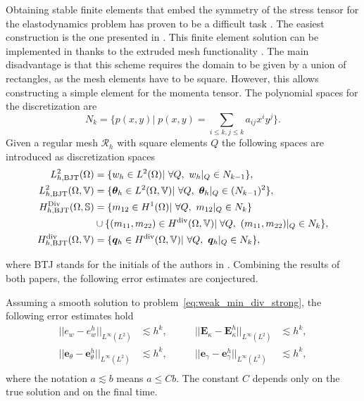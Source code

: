Obtaining stable finite elements that embed the symmetry of the stress tensor for the elastodynamics problem has proven to be a difficult task \cite{arnold2002mixed}. The easiest construction is the one presented in \cite{becache2001elas}. This finite element solution can be implemented in {} \cite{rathgeber2017firedrake} thanks to the extruded mesh functionality \cite{mcrae2016}.  The main disadvantage is that this scheme requires the domain to be given by a union of rectangles, as the mesh elements have to be square. However, this allows constructing a simple element for the momenta tensor. The polynomial spaces for the discretization are
\[
N_{k} = \{p(x, y)| \; p(x, y) = \sum_{i\le k, j\le k} a_{ij} x^i y^j  \}.
\]
Given a regular mesh $\mathcal{R}_h$ with square elements $Q$ the following spaces are introduced as discretization spaces
\begin{equation}
\label{eq:BTJ}
\begin{aligned}
L_{h, \text{BJT}}^2(\Omega) &= \{w_h \in L^2(\Omega) | \ \forall Q, \ w_h|_{Q} \in N_{k-1} \}, \\
L_{h, \text{BJT}}^2(\Omega, \mathbb{V}) &= \{\bm{\theta}_h \in L^2(\Omega, \mathbb{V}) | \ \forall Q,\ \bm{\theta}_h|_{Q} \in (N_{k-1})^2 \}, \\
H_{h, \text{BJT}}^{\operatorname*{Div}}(\Omega, \mathbb{S}) &= \{m_{12} \in H^1(\Omega)| \ \forall Q,\ m_{12}|_{Q} \in N_{k} \}  \\
&\cup \{(m_{11}, m_{22}) \in H^{\operatorname{div}}(\Omega, \mathbb{V})| \; \forall Q,\ (m_{11}, m_{22})|_{Q} \in N_{k} \}, \\
H_{h, \text{BJT}}^{\operatorname{div}}(\Omega, \mathbb{V}) &= \{\bm{q}_h \in H^{\operatorname{div}}(\Omega, \mathbb{V}) | \ \forall Q,\ \bm{q}_h|_{Q} \in N_{k} \}, \\ 
\end{aligned}
\end{equation}

where BTJ stands for the initials of the authors in \cite{becache2000wave,becache2001elas}. Combining the results of both papers, the following error estimates are conjectured.
\begin{conjecture}\label{conj:BJTestimates}
	Assuming a smooth solution to problem~\eqref{eq:weak_min_div_strong}, the following error estimates hold 
	\begin{equation}
	\label{eq:errBEC}
	\begin{aligned}
	||e_w - e_w^h||_{L^{\infty}(L^2)} &\lesssim h^{k}, \\
	||\bm{e}_\theta - \bm{e}_\theta^h||_{L^{\infty}(L^2)} &\lesssim h^{k}, \\
	\end{aligned} \qquad
	\begin{aligned}
	||\bm{E}_\kappa - \bm{E}_\kappa^h||_{L^{\infty}(L^2)} &\lesssim  h^{k}, \\
	||\bm{e}_\gamma - \bm{e}_\gamma^ h||_{L^{\infty}(L^2)} &\lesssim  h^{k}, \\
	\end{aligned} 
	\end{equation}
	where the notation $a \lesssim  b$ means $a \le C b$. The constant $C$ depends only on the true solution and on the final time.
\end{conjecture}


